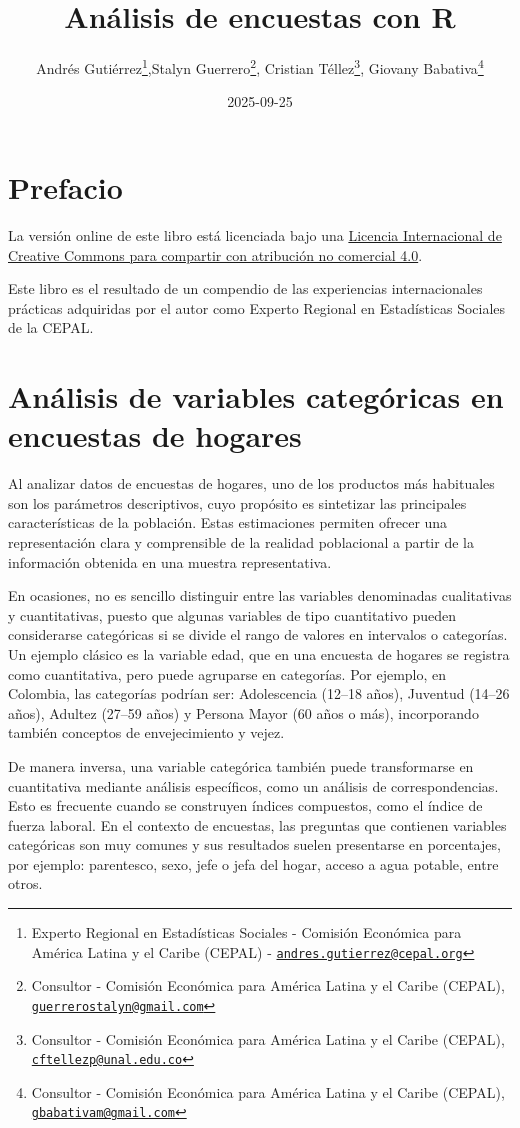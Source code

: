 \documentclass[
  12pt,
]{book}
\title{Análisis de encuestas con R}
\author{Andrés Gutiérrez\footnote{Experto Regional en Estadísticas Sociales - Comisión Económica para América Latina y el Caribe (CEPAL) - \href{mailto:andres.gutierrez@cepal.org}{\nolinkurl{andres.gutierrez@cepal.org}}},Stalyn Guerrero\footnote{Consultor - Comisión Económica para América Latina y el Caribe (CEPAL), \href{mailto:guerrerostalyn@gmail.com}{\nolinkurl{guerrerostalyn@gmail.com}}}, Cristian Téllez\footnote{Consultor - Comisión Económica para América Latina y el Caribe (CEPAL), \href{mailto:cftellezp@unal.edu.co}{\nolinkurl{cftellezp@unal.edu.co}}}, Giovany Babativa\footnote{Consultor - Comisión Económica para América Latina y el Caribe (CEPAL), \href{mailto:gbabativam@gmail.com}{\nolinkurl{gbabativam@gmail.com}}}}
\date{2025-09-25}
\begin{document}
\maketitle

{
\hypersetup{linkcolor=}
\setcounter{tocdepth}{1}
\tableofcontents
}
\listoffigures
\listoftables
\chapter*{Prefacio}\label{prefacio}

La versión online de este libro está licenciada bajo una \href{http://creativecommons.org/licenses/by-nc-sa/4.0/}{Licencia Internacional de Creative Commons para compartir con atribución no comercial 4.0}.

Este libro es el resultado de un compendio de las experiencias internacionales prácticas adquiridas por el autor como Experto Regional en Estadísticas Sociales de la CEPAL.

\chapter{Análisis de variables categóricas en encuestas de hogares}\label{anuxe1lisis-de-variables-categuxf3ricas-en-encuestas-de-hogares}

Al analizar datos de encuestas de hogares, uno de los productos más habituales son los parámetros descriptivos, cuyo propósito es sintetizar las principales características de la población. Estas estimaciones permiten ofrecer una representación clara y comprensible de la realidad poblacional a partir de la información obtenida en una muestra representativa.

En ocasiones, no es sencillo distinguir entre las variables denominadas cualitativas y cuantitativas, puesto que algunas variables de tipo cuantitativo pueden considerarse categóricas si se divide el rango de valores en intervalos o categorías. Un ejemplo clásico es la variable edad, que en una encuesta de hogares se registra como cuantitativa, pero puede agruparse en categorías. Por ejemplo, en Colombia, las categorías podrían ser: Adolescencia (12--18 años), Juventud (14--26 años), Adultez (27--59 años) y Persona Mayor (60 años o más), incorporando también conceptos de envejecimiento y vejez.

De manera inversa, una variable categórica también puede transformarse en cuantitativa mediante análisis específicos, como un análisis de correspondencias. Esto es frecuente cuando se construyen índices compuestos, como el índice de fuerza laboral. En el contexto de encuestas, las preguntas que contienen variables categóricas son muy comunes y sus resultados suelen presentarse en porcentajes, por ejemplo: parentesco, sexo, jefe o jefa del hogar, acceso a agua potable, entre otros.
\end{document}
